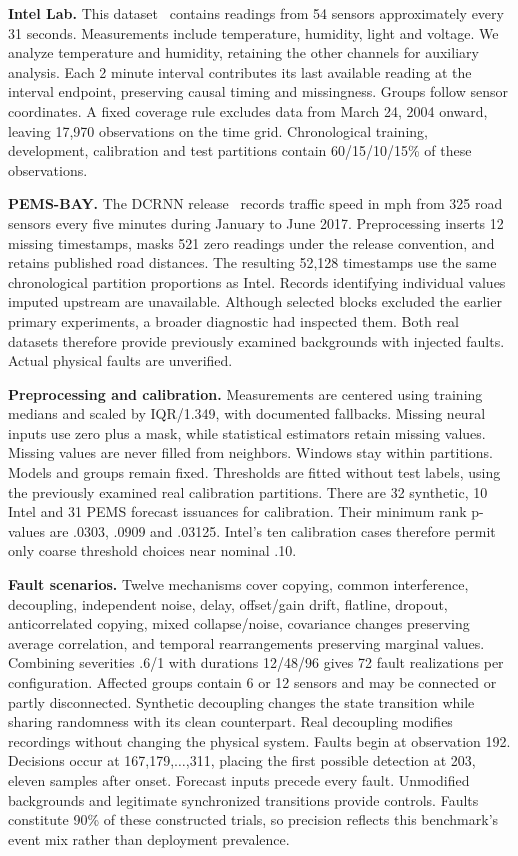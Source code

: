 \documentclass{llncs}
\begin{document}
\textbf{Intel Lab.} This dataset~\cite{intel} contains readings from 54 sensors
approximately every 31 seconds. Measurements include temperature, humidity,
light and voltage. We analyze temperature and humidity, retaining the other
channels for auxiliary analysis. Each 2 minute interval contributes its
last available reading at the interval endpoint, preserving causal timing
and missingness. Groups follow sensor coordinates. A fixed coverage rule
excludes data from March 24, 2004 onward, leaving 17,970 observations on the
time grid. Chronological training, development, calibration and test
partitions contain 60/15/10/15\% of these observations.

\textbf{PEMS-BAY.} The DCRNN release~\cite{dcrnn} records traffic speed in mph
from 325 road sensors every five minutes during January to June 2017.
Preprocessing inserts 12 missing timestamps, masks 521 zero readings under
the release convention, and retains published road distances. The resulting
52,128 timestamps use the same chronological partition proportions as Intel.
Records identifying individual values imputed upstream are unavailable.
Although selected blocks excluded the earlier primary experiments, a broader
diagnostic had inspected them. Both real datasets therefore provide previously
examined backgrounds with injected faults. Actual physical faults are unverified.

\textbf{Preprocessing and calibration.} Measurements are centered using
training medians and scaled by IQR/1.349, with documented fallbacks.
Missing neural inputs use zero plus a mask, while statistical estimators
retain missing values. Missing values are never filled from neighbors.
Windows stay within partitions. Models and groups remain fixed.
Thresholds are fitted without test labels, using the previously examined real
calibration partitions. There are 32 synthetic, 10 Intel and 31 PEMS forecast
issuances for calibration. Their minimum rank p-values are .0303, .0909 and
.03125. Intel's ten calibration cases therefore permit only coarse threshold
choices near nominal .10.

\textbf{Fault scenarios.} Twelve mechanisms cover copying, common interference,
decoupling, independent noise, delay, offset/gain drift, flatline, dropout,
anticorrelated copying, mixed collapse/noise, covariance changes preserving
average correlation, and temporal rearrangements preserving marginal values.
Combining severities .6/1 with durations 12/48/96 gives 72 fault realizations
per configuration. Affected groups contain 6 or 12 sensors and may be connected
or partly disconnected. Synthetic decoupling changes the state transition
while sharing randomness with its clean counterpart. Real decoupling modifies
recordings without changing the physical system. Faults begin at observation
192. Decisions occur at 167,179,$\ldots$,311, placing the first possible
detection at 203, eleven samples after onset. Forecast inputs precede every
fault. Unmodified backgrounds and legitimate synchronized transitions provide
controls. Faults constitute 90\% of these constructed trials, so precision
reflects this benchmark's event mix rather than deployment prevalence.
\end{document}
